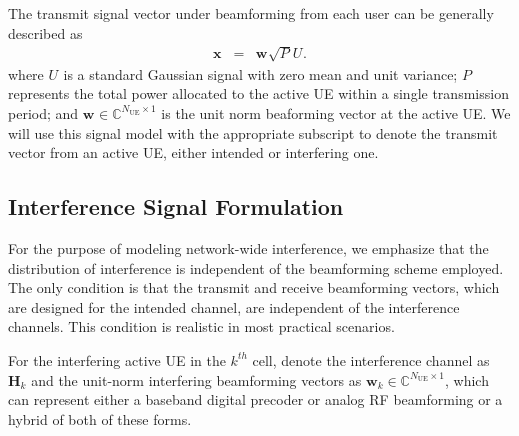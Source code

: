 \documentclass[12pt, draftclsnofoot, onecolumn]{IEEEtran}
\theoremstyle{plain}
\begin{document}
The transmit signal vector under beamforming from each user can be generally described as \vspace{-.1in}%
\begin{eqnarray}\label{B3}
\textbf{x}_{}&\!\!\!=&\!\!\! \textbf{w}_{} \sqrt{P_{}} U_{}.
\end{eqnarray} 
%
where $U_{}$ is a standard Gaussian signal with zero mean and unit variance; $P_{}$ represents the total power allocated to the active {UE} within a single transmission period; and $\textbf{w}_{} \in \mathbb{C}^{N_{\text{UE}}\times 1}$ is the unit norm beaforming vector at the active {UE}. We will use this signal model with the appropriate subscript to denote the transmit vector from an active UE, either intended or interfering one.

%
%
%
\vspace{-.1in}
\subsection{Interference {\color{black}Signal} Formulation}\vspace{-.1in}
For the purpose of modeling network-wide interference, we emphasize that the distribution of interference is independent of the beamforming scheme employed. The only condition is that the transmit and receive beamforming vectors, which are designed for the intended channel, are independent of the interference channels. This condition is realistic in most practical scenarios.

For the interfering active {UE} in the $k^{th}$ cell, denote the interference channel as ${\mathbf{{H}}_{k}^{}}$ and the unit-norm interfering beamforming vectors as $\textbf{w}_{k} \in \mathbb{C}^{N_{\text{UE}}\times 1}${, which can represent either a baseband digital precoder or analog RF beamforming or a hybrid of both of these forms}. 
%
\end{document}
